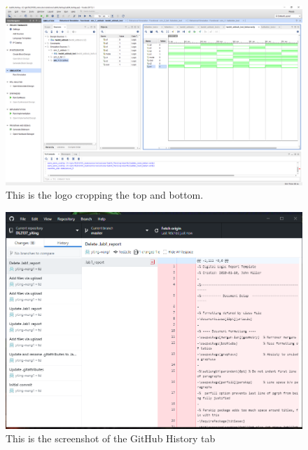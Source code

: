 \documentclass[11pt]{article}
\begin{document}
\begin{figure}[ht]\centering
	\includegraphics[width=1\textwidth,trim=8cm 8cm 0cm 0cm,clip]{Lab1Table}
	\caption{This is the logo cropping the top and bottom.}
	\label{fig:another_image}
\end{figure}
 
\begin{figure}[ht]\centering
	\includegraphics[width=1\textwidth]{GitHub}
	\caption{This is the screenshot of the GitHub History tab}
	\label{fig:another_image}
\end{figure}
\end{document}
